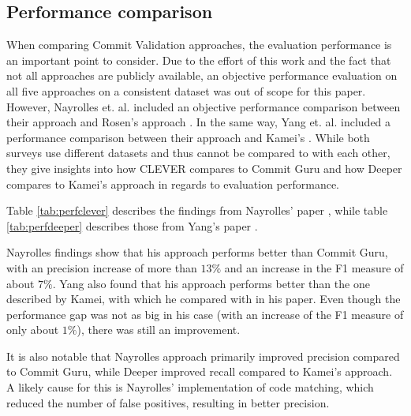 \subsection{Performance comparison}
\label{sec:performance}

When comparing Commit Validation approaches, the evaluation performance is an important point to consider. Due to the effort of this work and the fact that not all approaches are publicly available, an objective performance evaluation on all five approaches on a consistent dataset was out of scope for this paper. However, Nayrolles et. al. included an objective performance comparison between their approach and Rosen's approach \cite{Nayrolles2018}. In the same 
way, %
Yang et. al. included a performance comparison between their approach and Kamei's \cite{Yang2015}. While both surveys use different datasets and thus cannot be compared to with each other, they give insights into how CLEVER compares to Commit Guru and how Deeper compares to Kamei's approach in regards to evaluation performance.

Table \ref{tab:perfclever} describes the findings from Nayrolles' paper \cite{Nayrolles2018}, while table \ref{tab:perfdeeper} describes those from Yang's paper \cite{Yang2015}.

Nayrolles findings show that his approach performs better than Commit Guru, with an precision increase of more than $13\%$ and an increase in the F1 measure of about $7\%$. Yang also found that his approach performs better than the one described by Kamei, with which he compared with in his paper. Even though the performance gap was not as big in his case (with an increase of the F1 measure of only about $1\%$), there was still an improvement. 

It is also notable that Nayrolles approach primarily improved precision compared to Commit Guru, while Deeper improved recall compared to Kamei's approach. 
A likely cause for this is Nayrolles' implementation of code matching, which reduced the number of false positives, resulting in better precision.


